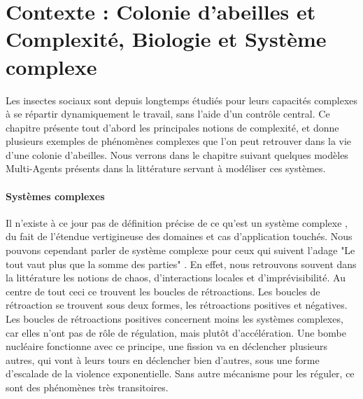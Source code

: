 \chapter*{Contexte : Colonie d'abeilles et Complexité, Biologie et Système complexe}
	\label{sectionBio}
	
	Les insectes sociaux sont depuis longtemps étudiés pour leurs capacités complexes à se répartir dynamiquement le travail, sans l'aide d'un contrôle central. Ce chapitre présente tout d'abord les principales notions de complexité, et donne plusieurs exemples de phénomènes complexes que l'on peut retrouver dans la vie d'une colonie d'abeilles. Nous verrons dans le chapitre suivant quelques modèles Multi-Agents présents dans la littérature servant à modéliser ces systèmes.

	
		\subsubsection{Systèmes complexes}
		
			Il n'existe à ce jour pas de définition précise de ce qu'est un système complexe \cite{heylighen_complexity_2008}, du fait de l'étendue vertigineuse des domaines et cas d'application touchés. Nous pouvons cependant parler de système complexe pour ceux qui suivent l'adage "Le tout vaut plus que la somme des parties" \cite{edmonds_what_1999}. En effet, nous retrouvons souvent dans la littérature les notions de chaos, d'interactions locales et d'imprévisibilité. Au centre de tout ceci ce trouvent les boucles de rétroactions. Les boucles de rétroaction se trouvent sous deux formes, les rétroactions positives et négatives. Les boucles de rétroactions positives concernent moins les systèmes complexes, car elles n'ont pas de rôle de régulation, mais plutôt d'accélération. Une bombe nucléaire fonctionne avec ce principe, une fission va en déclencher plusieurs autres, qui vont à leurs tours en déclencher bien d'autres, sous une forme d'escalade de la violence exponentielle. Sans autre mécanisme pour les réguler, ce sont des phénomènes très transitoires.
			
